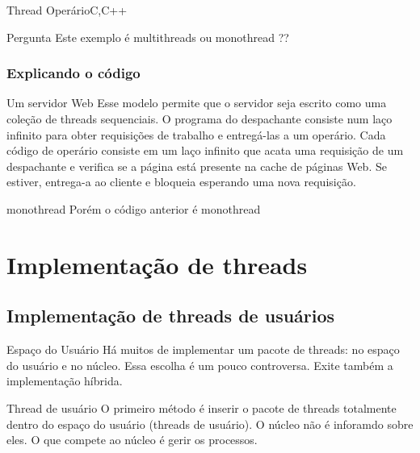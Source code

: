 \documentclass[11pt]{beamer}
\begin{document}
\begin{frame}{ Thread Operário}{C,C++}
\lstOp 
\pause

\begin{block}{ Pergunta}
 Este exemplo é multithreads ou monothread ??
\end{block}
\end{frame}


\begin{frame}\frametitle{ Explicando o código}

\begin{block}{ Um servidor Web}
Esse modelo permite que o servidor seja escrito como uma coleção de threads sequenciais.
O programa do despachante consiste num laço infinito para obter requisições de trabalho e entregá-las a um operário.
Cada código de operário consiste em um laço infinito que acata uma requisição de um despachante e verifica se a página está presente na cache 
de páginas Web. Se estiver, entrega-a ao cliente e bloqueia esperando uma nova requisição.
\end{block}

\pause
\begin{block}{ monothread}
 Porém o código anterior é monothread
\end{block}

\end{frame}


\section{Implementação de threads}
\subsection*{Implementação de threads de usuários}

\begin{frame}{Espaço do Usuário}
 Há muitos de implementar um pacote de threads: no espaço do usuário e no núcleo.
 Essa escolha é um pouco controversa. Exite também a implementação híbrida.
 \begin{block}{ Thread de usuário}
  O primeiro método é inserir o pacote de threads totalmente dentro do espaço do usuário (threads de usuário).
  O núcleo não é inforamdo sobre eles. O que compete ao núcleo é gerir os processos.
 \end{block}
 
\end{frame}
\end{document}
